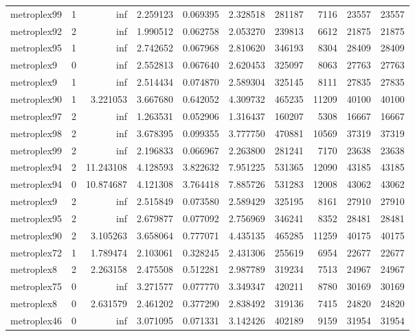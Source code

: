 \documentclass[../../../thesis.tex]{subfiles}
\begin{document}
\begin{longtable}{|l|r|r|r|r|r|r|r|r|r|}
metroplex99 & 1 & inf & 2.259123 & 0.069395 & 2.328518 & 281187 & 7116 & 23557 & 23557 \\
metroplex92 & 2 & inf & 1.990512 & 0.062758 & 2.053270 & 239813 & 6612 & 21875 & 21875 \\
metroplex95 & 1 & inf & 2.742652 & 0.067968 & 2.810620 & 346193 & 8304 & 28409 & 28409 \\
metroplex9 & 0 & inf & 2.552813 & 0.067640 & 2.620453 & 325097 & 8063 & 27763 & 27763 \\
metroplex9 & 1 & inf & 2.514434 & 0.074870 & 2.589304 & 325145 & 8111 & 27835 & 27835 \\
metroplex90 & 1 & 3.221053 & 3.667680 & 0.642052 & 4.309732 & 465235 & 11209 & 40100 & 40100 \\
metroplex97 & 2 & inf & 1.263531 & 0.052906 & 1.316437 & 160207 & 5308 & 16667 & 16667 \\
metroplex98 & 2 & inf & 3.678395 & 0.099355 & 3.777750 & 470881 & 10569 & 37319 & 37319 \\
metroplex99 & 2 & inf & 2.196833 & 0.066967 & 2.263800 & 281241 & 7170 & 23638 & 23638 \\
metroplex94 & 2 & 11.243108 & 4.128593 & 3.822632 & 7.951225 & 531365 & 12090 & 43185 & 43185 \\
metroplex94 & 0 & 10.874687 & 4.121308 & 3.764418 & 7.885726 & 531283 & 12008 & 43062 & 43062 \\
metroplex9 & 2 & inf & 2.515849 & 0.073580 & 2.589429 & 325195 & 8161 & 27910 & 27910 \\
metroplex95 & 2 & inf & 2.679877 & 0.077092 & 2.756969 & 346241 & 8352 & 28481 & 28481 \\
metroplex90 & 2 & 3.105263 & 3.658064 & 0.777071 & 4.435135 & 465285 & 11259 & 40175 & 40175 \\
metroplex72 & 1 & 1.789474 & 2.103061 & 0.328245 & 2.431306 & 255619 & 6954 & 22677 & 22677 \\
metroplex8 & 2 & 2.263158 & 2.475508 & 0.512281 & 2.987789 & 319234 & 7513 & 24967 & 24967 \\
metroplex75 & 0 & inf & 3.271577 & 0.077770 & 3.349347 & 420211 & 8780 & 30169 & 30169 \\
metroplex8 & 0 & 2.631579 & 2.461202 & 0.377290 & 2.838492 & 319136 & 7415 & 24820 & 24820 \\
metroplex46 & 0 & inf & 3.071095 & 0.071331 & 3.142426 & 402189 & 9159 & 31954 & 31954 \\
\end{longtable}
\end{document}
